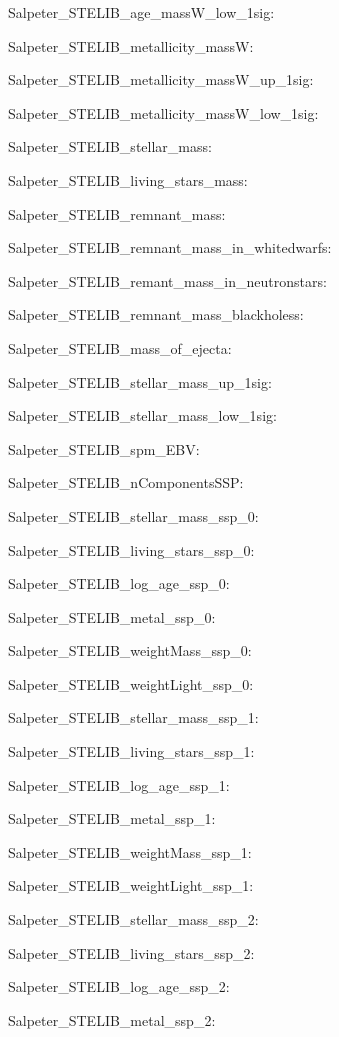 \item Salpeter\_STELIB\_age\_massW\_low\_1sig: 
\item Salpeter\_STELIB\_metallicity\_massW: 
\item Salpeter\_STELIB\_metallicity\_massW\_up\_1sig: 
\item Salpeter\_STELIB\_metallicity\_massW\_low\_1sig: 
\item Salpeter\_STELIB\_stellar\_mass: 
\item Salpeter\_STELIB\_living\_stars\_mass: 
\item Salpeter\_STELIB\_remnant\_mass: 
\item Salpeter\_STELIB\_remnant\_mass\_in\_whitedwarfs: 
\item Salpeter\_STELIB\_remant\_mass\_in\_neutronstars: 
\item Salpeter\_STELIB\_remnant\_mass\_blackholess: 
\item Salpeter\_STELIB\_mass\_of\_ejecta: 
\item Salpeter\_STELIB\_stellar\_mass\_up\_1sig: 
\item Salpeter\_STELIB\_stellar\_mass\_low\_1sig: 
\item Salpeter\_STELIB\_spm\_EBV: 
\item Salpeter\_STELIB\_nComponentsSSP: 
\item Salpeter\_STELIB\_stellar\_mass\_ssp\_0: 
\item Salpeter\_STELIB\_living\_stars\_ssp\_0: 
\item Salpeter\_STELIB\_log\_age\_ssp\_0: 
\item Salpeter\_STELIB\_metal\_ssp\_0: 
\item Salpeter\_STELIB\_weightMass\_ssp\_0: 
\item Salpeter\_STELIB\_weightLight\_ssp\_0: 
\item Salpeter\_STELIB\_stellar\_mass\_ssp\_1: 
\item Salpeter\_STELIB\_living\_stars\_ssp\_1: 
\item Salpeter\_STELIB\_log\_age\_ssp\_1: 
\item Salpeter\_STELIB\_metal\_ssp\_1: 
\item Salpeter\_STELIB\_weightMass\_ssp\_1: 
\item Salpeter\_STELIB\_weightLight\_ssp\_1: 
\item Salpeter\_STELIB\_stellar\_mass\_ssp\_2: 
\item Salpeter\_STELIB\_living\_stars\_ssp\_2: 
\item Salpeter\_STELIB\_log\_age\_ssp\_2: 
\item Salpeter\_STELIB\_metal\_ssp\_2: 
